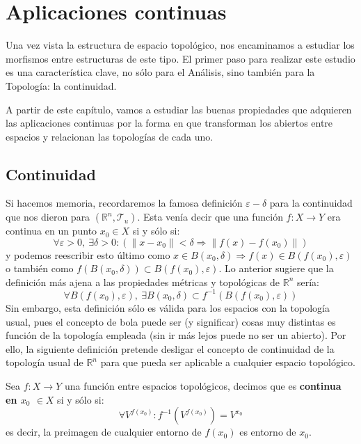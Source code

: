\chapter{Aplicaciones continuas}%
\label{cha:aplicaciones_continuas}
Una vez vista la estructura de espacio topológico, nos encaminamos a estudiar los morfismos entre estructuras de este tipo. El primer paso para realizar este estudio es una característica clave, no sólo para el Análisis, sino  también para la Topología: la continuidad.

A partir de este capítulo, vamos a estudiar las buenas propiedades que adquieren las aplicaciones continuas por la forma en que transforman los abiertos entre espacios y relacionan las topologías de cada uno.

\section{Continuidad}%
\label{sec:continuidad}

Si hacemos memoria, recordaremos la famosa definición $\varepsilon-\delta$ para la continuidad que nos dieron para $\left( \mathbb{R}^n, \mathcal{T}_u \right)$. Esta venía decir que una función $f : X \rightarrow Y$ era continua en un punto $x_0\in X$ si y sólo si:
\[
\forall \varepsilon > 0, \ \exists \delta > 0 : \left(\lVert x - x_0 \rVert < \delta \Rightarrow \lVert f(x) - f(x_0) \rVert \right)
\]
y podemos reescribir esto último como $x \in B\left( x_0, \delta \right) \Rightarrow f\left( x \right) \in B\left( f\left( x_0 \right), \varepsilon \right)$ o también como $f\left( B\left( x_0, \delta \right) \right) \subset B\left( f\left( x_0 \right), \varepsilon \right) $. Lo anterior sugiere que la definición más ajena a las propiedades métricas y topológicas de $\mathbb{R}^n$ sería:
\[
\forall B\left( f\left( x_0 \right), \varepsilon \right),\ \exists B\left( x_0, \delta \right) \subset f^{-1}\left( B\left( f\left( x_0 \right), \varepsilon \right) \right)
\]
Sin embargo, esta definición sólo es válida para los espacios con la topología usual, pues el concepto de bola puede ser (y significar) cosas muy distintas es función de la topología empleada (sin ir más lejos puede no ser un abierto). Por ello, la siguiente definición pretende desligar el concepto de continuidad de la topología usual de $\mathbb{R}^n$ para que pueda ser aplicable a cualquier espacio topológico.

\begin{defi}[Continuidad]
Sea $f: X \rightarrow Y$ una función entre espacios topológicos, decimos que es \textbf{continua en $x_0$ $\in X$} si y sólo si:
\[
\forall V^{f\left( x_0 \right)} :  f^{-1}\left( V^{f\left( x_0 \right)} \right) = V^{x_0} 
\]
es decir, la preimagen de cualquier entorno de $f(x_0)$ es entorno de $x_0$.
\end{defi}

